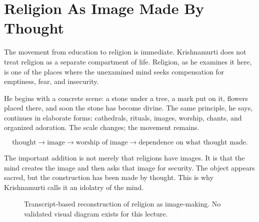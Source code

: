 \documentclass[11pt,oneside]{book}
\begin{document}
\section{Religion As Image Made By Thought}

The movement from education to religion is immediate. Krishnamurti does not treat religion as a separate compartment of life. Religion, as he examines it here, is one of the places where the unexamined mind seeks compensation for emptiness, fear, and insecurity.

He begins with a concrete scene: a stone under a tree, a mark put on it, flowers placed there, and soon the stone has become divine. The same principle, he says, continues in elaborate forms: cathedrals, rituals, images, worship, chants, and organized adoration. The scale changes; the movement remains.

\begin{equation}
\text{thought}
\longrightarrow
\text{image}
\longrightarrow
\text{worship of image}
\longrightarrow
\text{dependence on what thought made}.
\end{equation}

The important addition is not merely that religions have images. It is that the mind creates the image and then asks that image for security. The object appears sacred, but the construction has been made by thought. This is why Krishnamurti calls it an idolatry of the mind.

\begin{figure}
\centering
{}
\caption{Transcript-based reconstruction of religion as image-making. No validated visual diagram exists for this lecture.}
\end{figure}
\end{document}
